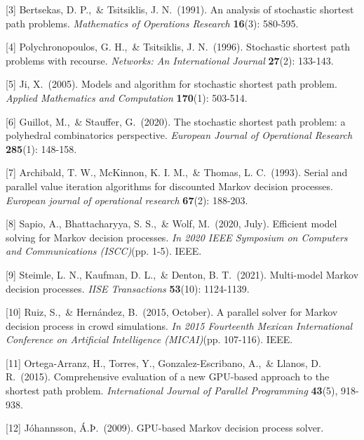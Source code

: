 \documentclass{article}
\begin{document}
[3] Bertsekas, D. P.,\ \& Tsitsiklis, J. N.\ (1991). An analysis of stochastic shortest path problems. 
  {\it Mathematics of Operations Research} {\bf 16}(3): 580-595.

[4] Polychronopoulos, G. H.,\ \& Tsitsiklis, J. N.\ (1996). Stochastic shortest path problems with 
  recourse. {\it Networks: An International Journal} {\bf 27}(2): 133-143.

[5] Ji, X.\ (2005). Models and algorithm for stochastic shortest path problem. {\it Applied Mathematics 
  and Computation} {\bf 170}(1): 503-514.

[6] Guillot, M.,\ \& Stauffer, G.\ (2020). The stochastic shortest path problem: a polyhedral combinatorics 
  perspective. {\it European Journal of Operational Research} {\bf 285}(1): 148-158.

[7] Archibald, T. W., McKinnon, K. I. M.,\ \& Thomas, L. C.\ (1993). Serial and parallel value iteration 
  algorithms for discounted Markov decision processes. {\it European journal of operational research} {\bf 67}(2): 188-203.

[8] Sapio, A., Bhattacharyya, S. S.,\ \& Wolf, M.\ (2020, July). Efficient model solving for Markov decision processes. 
  {\it In 2020 IEEE Symposium on Computers and Communications (ISCC)}(pp. 1-5). IEEE.

[9] Steimle, L. N., Kaufman, D. L.,\ \& Denton, B. T.\ (2021). Multi-model Markov decision processes. 
  {\it IISE Transactions} {\bf 53}(10): 1124-1139.

[10] Ruiz, S.,\ \& Hernández, B.\ (2015, October). A parallel solver for Markov decision process in crowd simulations. 
  {\it In 2015 Fourteenth Mexican International Conference on Artificial Intelligence (MICAI)}(pp. 107-116). IEEE.

[11] Ortega-Arranz, H., Torres, Y., Gonzalez-Escribano, A.,\ \& Llanos, D. R.\ (2015). Comprehensive evaluation of 
  a new GPU-based approach to the shortest path problem. {\it International Journal of Parallel Programming} {\bf 43}(5), 918-938.

[12] Jóhannsson, Á.Þ.\ (2009). GPU-based Markov decision process solver.
\end{document}
